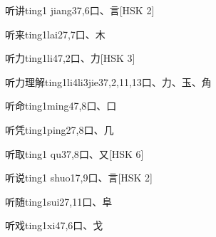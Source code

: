 \begin{EntryWithPhonetic}{听讲}{ting1 jiang3}{7,6}{⼝、⾔}[HSK 2]
\end{EntryWithPhonetic}

\begin{EntryWithPhonetic}{听来}{ting1lai2}{7,7}{⼝、⽊}
\end{EntryWithPhonetic}

\begin{EntryWithPhonetic}{听力}{ting1li4}{7,2}{⼝、⼒}[HSK 3]
\end{EntryWithPhonetic}

\begin{EntryWithPhonetic}{听力理解}{ting1li4li3jie3}{7,2,11,13}{⼝、⼒、⽟、⾓}
\end{EntryWithPhonetic}

\begin{EntryWithPhonetic}{听命}{ting1ming4}{7,8}{⼝、⼝}
\end{EntryWithPhonetic}

\begin{EntryWithPhonetic}{听凭}{ting1ping2}{7,8}{⼝、⼏}
\end{EntryWithPhonetic}

\begin{EntryWithPhonetic}{听取}{ting1 qu3}{7,8}{⼝、⼜}[HSK 6]
\end{EntryWithPhonetic}

\begin{EntryWithPhonetic}{听说}{ting1 shuo1}{7,9}{⼝、⾔}[HSK 2]
\end{EntryWithPhonetic}

\begin{EntryWithPhonetic}{听随}{ting1sui2}{7,11}{⼝、⾩}
\end{EntryWithPhonetic}

\begin{EntryWithPhonetic}{听戏}{ting1xi4}{7,6}{⼝、⼽}
\end{EntryWithPhonetic}

